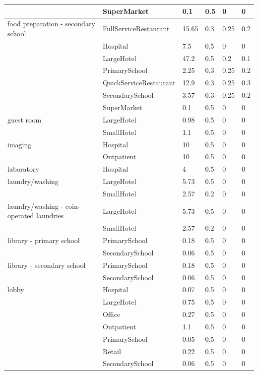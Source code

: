 \begin{center}
\begin{longtable}{|p{2.2in}|p{1.3in}|p{0.7in}|p{0.6in}|p{0.6in}|p{0.6in}|}
 & SuperMarket & 0.1 & 0.5 & 0 & 0 \\ \hline
food preparation - secondary school & FullServiceRestaurant & 15.65 & 0.3 & 0.25 & 0.2 \\ \hline
 & Hospital & 7.5 & 0.5 & 0 & 0 \\ \hline
 & LargeHotel & 47.2 & 0.5 & 0.2 & 0.1 \\ \hline
 & PrimarySchool & 2.25 & 0.3 & 0.25 & 0.2 \\ \hline
 & QuickServiceRestaurant & 12.9 & 0.3 & 0.25 & 0.3 \\ \hline
 & SecondarySchool & 3.57 & 0.3 & 0.25 & 0.2 \\ \hline
 & SuperMarket & 0.1 & 0.5 & 0 & 0 \\ \hline
guest room & LargeHotel & 0.98 & 0.5 & 0 & 0 \\ \hline
 & SmallHotel & 1.1 & 0.5 & 0 & 0 \\ \hline
imaging & Hospital & 10 & 0.5 & 0 & 0 \\ \hline
 & Outpatient & 10 & 0.5 & 0 & 0 \\ \hline
laboratory & Hospital & 4 & 0.5 & 0 & 0 \\ \hline
laundry/washing & LargeHotel & 5.73 & 0.5 & 0 & 0 \\ \hline
 & SmallHotel & 2.57 & 0.2 & 0 & 0 \\ \hline
laundry/washing - coin-operated laundries & LargeHotel & 5.73 & 0.5 & 0 & 0 \\ \hline
 & SmallHotel & 2.57 & 0.2 & 0 & 0 \\ \hline
library - primary school & PrimarySchool & 0.18 & 0.5 & 0 & 0 \\ \hline
 & SecondarySchool & 0.06 & 0.5 & 0 & 0 \\ \hline
library - secondary school & PrimarySchool & 0.18 & 0.5 & 0 & 0 \\ \hline
 & SecondarySchool & 0.06 & 0.5 & 0 & 0 \\ \hline
lobby & Hospital & 0.07 & 0.5 & 0 & 0 \\ \hline
 & LargeHotel & 0.75 & 0.5 & 0 & 0 \\ \hline
 & Office & 0.27 & 0.5 & 0 & 0 \\ \hline
 & Outpatient & 1.1 & 0.5 & 0 & 0 \\ \hline
 & PrimarySchool & 0.05 & 0.5 & 0 & 0 \\ \hline
 & Retail & 0.22 & 0.5 & 0 & 0 \\ \hline
 & SecondarySchool & 0.06 & 0.5 & 0 & 0 \\ \hline

\end{longtable}
\end{center}
